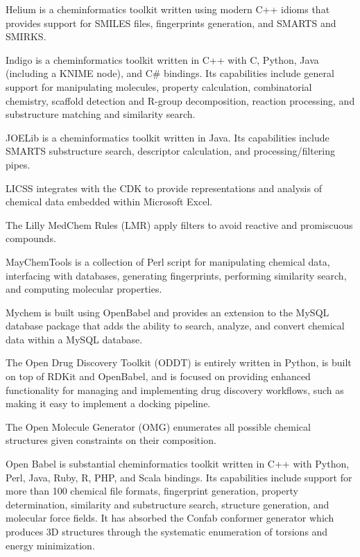 Helium is a cheminformatics toolkit written using modern C++ idioms that provides support for SMILES files, fingerprints generation, and SMARTS and SMIRKS.

Indigo \cite{Pavlov_2011} is a cheminformatics toolkit written in C++ with C, Python, Java (including a KNIME node), and C# bindings.  Its capabilities include general support for manipulating molecules, property calculation, combinatorial chemistry, scaffold detection and R-group decomposition, reaction processing, and substructure matching and similarity search.

JOELib is a cheminformatics toolkit written in Java. Its capabilities include SMARTS substructure search, descriptor calculation, and processing/filtering pipes.

LICSS \cite{Lawson_2012} integrates with the CDK to provide representations and analysis of chemical data embedded within Microsoft Excel.

The Lilly MedChem Rules (LMR)  \cite{Bruns_2012} apply filters to avoid reactive and promiscuous compounds.

MayChemTools is a collection of Perl script for manipulating chemical data, interfacing with databases, generating fingerprints, performing similarity search, and computing molecular properties.

Mychem is built using OpenBabel and provides an extension to the MySQL database package that adds the ability to search, analyze, and convert chemical data within a MySQL database.

The Open Drug Discovery Toolkit (ODDT) \cite{W_jcikowski_2015} is entirely written in Python, is built on top of RDKit and OpenBabel, and is focused on providing enhanced functionality for managing and implementing drug discovery workflows, such as making it easy to implement a docking pipeline. 

The Open Molecule Generator (OMG) \cite{Peironcely_2012} enumerates all possible chemical structures given constraints on their composition.

Open Babel \cite{O_Boyle_2011} is substantial cheminformatics toolkit written in C++ with Python, Perl, Java, Ruby, R, PHP, and Scala bindings.  Its capabilities include support for more than 100 chemical file formats, fingerprint generation, property determination, similarity and substructure search, structure generation, and molecular force fields.  It has absorbed the Confab \cite{confab} conformer generator which produces 3D structures through the systematic enumeration of torsions and energy minimization.

